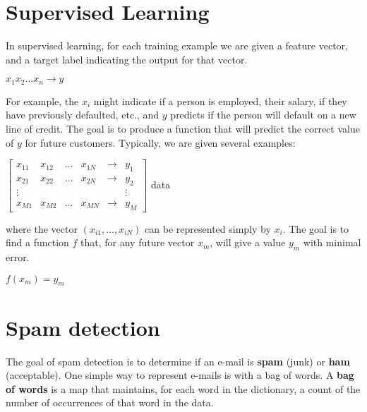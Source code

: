 \documentclass[10pt,a4paper]{article}
\begin{document}
\section{Supervised Learning}

In supervised learning, for each training example we are given a feature vector, and a target label indicating the output for that vector.
\begin{center}
$x_1 x_2 \dots x_n \rightarrow y$
\end{center}
For example, the $x_i$ might indicate if a person is employed, their salary, if they have previously defaulted, etc., and $y$ predicts if the person will default on a new line of credit. The goal is to produce a function that will predict the correct value of $y$ for future customers. Typically, we are given several examples:
\begin{center}
$\begin{bmatrix}
x_{11} & x_{12} & \dots & x_{1N} & \rightarrow & y_1 \\
x_{21} & x_{22} & \dots & x_{2N} & \rightarrow & y_2 \\
\vdots & & & & & \vdots \\
x_{M1} & x_{M2} & \dots & x_{MN} & \rightarrow & y_M
\end{bmatrix}$
data
\end{center}
where the vector $\left(x_{i1}, \dots, x_{iN}\right)$ can be represented simply by $x_i$. The goal is to find a function $f$ that, for any future vector $x_m$, will give a value $y_m$ with minimal error.
\begin{center}
$f(x_m) = y_m$
\end{center}

\section{Spam detection}

The goal of spam detection is to determine if an e-mail is \textbf{spam} (junk) or \textbf{ham} (acceptable). One simple way to represent e-mails is with a bag of words. A \textbf{bag of words} is a map that maintains, for each word in the dictionary, a count of the number of occurrences of that word in the data.
\end{document}
